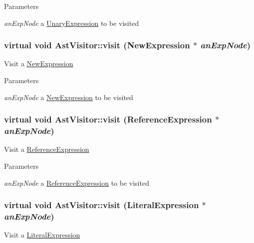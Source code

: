 \begin{DoxyParams}{Parameters}
\item[{\em anExpNode}]a \hyperlink{classUnaryExpression}{UnaryExpression} to be visited \end{DoxyParams}
\hypertarget{classAstVisitor_a84ce449d7f5ede3881cdcb8ac8f94078}{
\subsubsection[{visit}]{\setlength{\rightskip}{0pt plus 5cm}virtual void AstVisitor::visit ({\bf NewExpression} $\ast$ {\em anExpNode})}}
\label{classAstVisitor_a84ce449d7f5ede3881cdcb8ac8f94078}
Visit a \hyperlink{classNewExpression}{NewExpression}


\begin{DoxyParams}{Parameters}
\item[{\em anExpNode}]a \hyperlink{classNewExpression}{NewExpression} to be visited \end{DoxyParams}
\hypertarget{classAstVisitor_a20dc1c03f85502175abdd5cc7cd25a9d}{
\subsubsection[{visit}]{\setlength{\rightskip}{0pt plus 5cm}virtual void AstVisitor::visit ({\bf ReferenceExpression} $\ast$ {\em anExpNode})}}
\label{classAstVisitor_a20dc1c03f85502175abdd5cc7cd25a9d}
Visit a \hyperlink{classReferenceExpression}{ReferenceExpression}


\begin{DoxyParams}{Parameters}
\item[{\em anExpNode}]a \hyperlink{classReferenceExpression}{ReferenceExpression} to be visited \end{DoxyParams}
\hypertarget{classAstVisitor_a60b3207e90b0a520a30147d4f4fba2a0}{
\subsubsection[{visit}]{\setlength{\rightskip}{0pt plus 5cm}virtual void AstVisitor::visit ({\bf LiteralExpression} $\ast$ {\em anExpNode})}}
\label{classAstVisitor_a60b3207e90b0a520a30147d4f4fba2a0}
Visit a \hyperlink{classLiteralExpression}{LiteralExpression}


